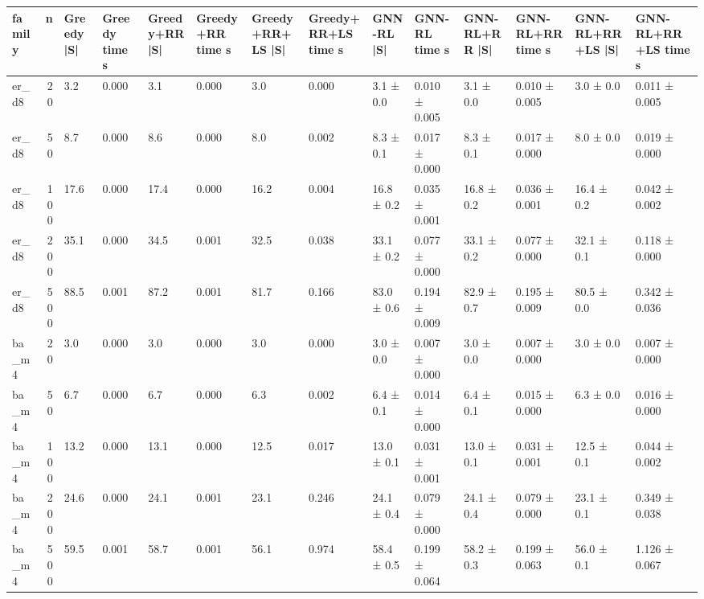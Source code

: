 \begin{tabular}{lrllllllllllll}
\toprule
family & n & Greedy |S| & Greedy time s & Greedy+RR |S| & Greedy+RR time s & Greedy+RR+LS |S| & Greedy+RR+LS time s & GNN-RL |S| & GNN-RL time s & GNN-RL+RR |S| & GNN-RL+RR time s & GNN-RL+RR+LS |S| & GNN-RL+RR+LS time s \\
\midrule
er\_d8 & 20 & 3.2 & 0.000 & 3.1 & 0.000 & 3.0 & 0.000 & 3.1 ± 0.0 & 0.010 ± 0.005 & 3.1 ± 0.0 & 0.010 ± 0.005 & 3.0 ± 0.0 & 0.011 ± 0.005 \\
er\_d8 & 50 & 8.7 & 0.000 & 8.6 & 0.000 & 8.0 & 0.002 & 8.3 ± 0.1 & 0.017 ± 0.000 & 8.3 ± 0.1 & 0.017 ± 0.000 & 8.0 ± 0.0 & 0.019 ± 0.000 \\
er\_d8 & 100 & 17.6 & 0.000 & 17.4 & 0.000 & 16.2 & 0.004 & 16.8 ± 0.2 & 0.035 ± 0.001 & 16.8 ± 0.2 & 0.036 ± 0.001 & 16.4 ± 0.2 & 0.042 ± 0.002 \\
er\_d8 & 200 & 35.1 & 0.000 & 34.5 & 0.001 & 32.5 & 0.038 & 33.1 ± 0.2 & 0.077 ± 0.000 & 33.1 ± 0.2 & 0.077 ± 0.000 & 32.1 ± 0.1 & 0.118 ± 0.000 \\
er\_d8 & 500 & 88.5 & 0.001 & 87.2 & 0.001 & 81.7 & 0.166 & 83.0 ± 0.6 & 0.194 ± 0.009 & 82.9 ± 0.7 & 0.195 ± 0.009 & 80.5 ± 0.0 & 0.342 ± 0.036 \\
ba\_m4 & 20 & 3.0 & 0.000 & 3.0 & 0.000 & 3.0 & 0.000 & 3.0 ± 0.0 & 0.007 ± 0.000 & 3.0 ± 0.0 & 0.007 ± 0.000 & 3.0 ± 0.0 & 0.007 ± 0.000 \\
ba\_m4 & 50 & 6.7 & 0.000 & 6.7 & 0.000 & 6.3 & 0.002 & 6.4 ± 0.1 & 0.014 ± 0.000 & 6.4 ± 0.1 & 0.015 ± 0.000 & 6.3 ± 0.0 & 0.016 ± 0.000 \\
ba\_m4 & 100 & 13.2 & 0.000 & 13.1 & 0.000 & 12.5 & 0.017 & 13.0 ± 0.1 & 0.031 ± 0.001 & 13.0 ± 0.1 & 0.031 ± 0.001 & 12.5 ± 0.1 & 0.044 ± 0.002 \\
ba\_m4 & 200 & 24.6 & 0.000 & 24.1 & 0.001 & 23.1 & 0.246 & 24.1 ± 0.4 & 0.079 ± 0.000 & 24.1 ± 0.4 & 0.079 ± 0.000 & 23.1 ± 0.1 & 0.349 ± 0.038 \\
ba\_m4 & 500 & 59.5 & 0.001 & 58.7 & 0.001 & 56.1 & 0.974 & 58.4 ± 0.5 & 0.199 ± 0.064 & 58.2 ± 0.3 & 0.199 ± 0.063 & 56.0 ± 0.1 & 1.126 ± 0.067 \\
\bottomrule
\end{tabular}
